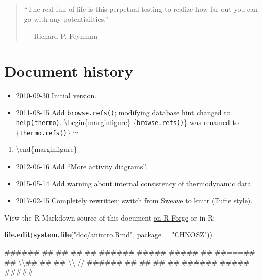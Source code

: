 \documentclass[]{tufte-book}
\newenvironment{Shaded}{}{}
\newcommand{\KeywordTok}[1]{\textcolor[rgb]{0.00,0.44,0.13}{\textbf{#1}}}
\newcommand{\DataTypeTok}[1]{\textcolor[rgb]{0.56,0.13,0.00}{#1}}
\newcommand{\StringTok}[1]{\textcolor[rgb]{0.25,0.44,0.63}{#1}}
\newcommand{\NormalTok}[1]{#1}
\providecommand{\tightlist}{%
  \setlength{\itemsep}{0pt}\setlength{\parskip}{0pt}}
\begin{document}
\begin{quote}
``The real fun of life is this perpetual testing to realize how far out
you can go with any potentialities.''

\hfill --- Richard P. Feynman
\end{quote}

\chapter{Document history}\label{document-history}

\begin{itemize}
\tightlist
\item
  2010-09-30 Initial version.
\item
  2011-08-15 Add {\texttt{browse.refs()}}; modifying database hint
  changed to {\texttt{help(thermo)}}.
  \textbackslash{}begin\{marginfigure\} \{\texttt{browse.refs()}\} was
  renamed to \{\texttt{thermo.refs()}\} in
\end{itemize}

\begin{enumerate}
\def\labelenumi{\arabic{enumi}.}
\setcounter{enumi}{2016}
\tightlist
\item
  \textbackslash{}end\{marginfigure\}
\end{enumerate}

\begin{itemize}
\tightlist
\item
  2012-06-16 Add ``More activity diagrams''.
\item
  2015-05-14 Add warning about internal consistency of thermodynamic
  data.
\item
  2017-02-15 Completely rewritten; switch from Sweave to knitr (Tufte
  style).
\end{itemize}

View the R Markdown source of this document
\href{https://r-forge.r-project.org/scm/viewvc.php/pkg/CHNOSZ/vignettes/anintro.Rmd?view=markup\&root=chnosz}{on
R-Forge} or in R:

\begin{Shaded}
\begin{Highlighting}[]
\KeywordTok{file.edit}\NormalTok{(}\KeywordTok{system.file}\NormalTok{(}\StringTok{"doc/anintro.Rmd"}\NormalTok{, }\DataTypeTok{package =} \StringTok{"CHNOSZ"}\NormalTok{))}
\end{Highlighting}
\end{Shaded}

\begin{Shaded}
\begin{Highlighting}[]
\NormalTok{   ######    ##   ##    ##   ##    ######     #####  #####}
\NormalTok{ ##         ##===##    ## \textbackslash{}\textbackslash{}##   ##    ##     \textbackslash{}\textbackslash{}       //}
\NormalTok{ ######    ##   ##    ##   ##    ######    #####      #####}
\end{Highlighting}
\end{Shaded}


\end{document}
